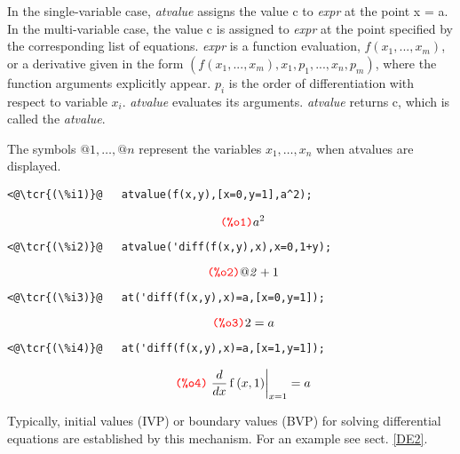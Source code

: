 \documentclass[../Maxima_Workbook.tex]{subfiles}
\begin{document}
\lz In the single-variable case, \emph{atvalue} assigns the value c to \emph{expr} at the point x = a. In the multi-variable case, the value c is assigned to \emph{expr} at the point specified by the corresponding list of equations. \emph{expr} is a function evaluation, $ f(x_1, ..., x_m) $, or a derivative given in the form $ (f(x_1, ...,
x_m), x_1, p_1, ..., x_n, p_m) $, where the function arguments explicitly appear.
$ p_i $ is the order of differentiation with respect to variable $ x_i $. \emph{atvalue} evaluates its arguments. \emph{atvalue} returns c, which is called the \emph{atvalue}.

\lz The symbols $ @1, \dots,@n $ represent the variables $ x_1,\dots,x_n $ when atvalues are displayed.

\lz \begin{small}
\color{blue} \leqn
\begin{lstlisting}
<@\tcr{(\%i1)}@   atvalue(f(x,y),[x=0,y=1],a^2);
\end{lstlisting}
\vspace{-4mm} \[\tag*{\tcr{\ttfamily (\%o1)}} {{a}^{2}} \]
\vspace{-8mm} \begin{lstlisting}
<@\tcr{(\%i2)}@   atvalue('diff(f(x,y),x),x=0,1+y);
\end{lstlisting}
\vspace{-4mm} \[\tag*{\tcr{\ttfamily (\%o2)}} \mathit{@ 2}+1 \]
\vspace{-8mm} \begin{lstlisting}
<@\tcr{(\%i3)}@   at('diff(f(x,y),x)=a,[x=0,y=1]);
\end{lstlisting}
\vspace{-4mm} \[\tag*{\tcr{\ttfamily (\%o3)}} 2=a \]
\vspace{-8mm} \begin{lstlisting}
<@\tcr{(\%i4)}@   at('diff(f(x,y),x)=a,[x=1,y=1]);
\end{lstlisting}
\vspace{-3mm} \[\tag*{\tcr{\ttfamily (\%o4)}} \left. \frac{d}{d x} \operatorname{f}\left( x,1\right) \right|_{x=1}=a \]
\color{black} \reqn
\end{small} \vspace{-4mm}

\lz Typically, initial values (IVP) or boundary values (BVP) for solving differential equations are established by this mechanism. For an example see sect. \ref{DE2}.

\lzz {} \hfill \tcr{[function]}
\end{document}
